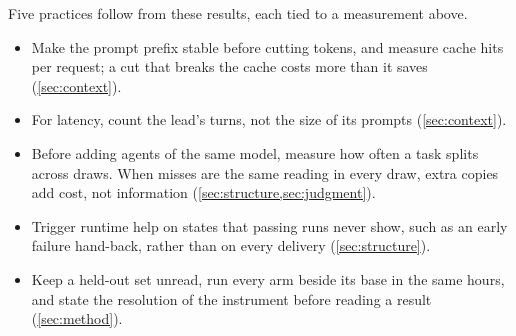  Five practices follow from these results, each tied to a
measurement above.
\begin{itemize}[leftmargin=1.4em]
  \item Make the prompt prefix stable before cutting tokens, and measure cache hits per request; a
    cut that breaks the cache costs more than it saves (\cref{sec:context}).
  \item For latency, count the lead's turns, not the size of its prompts (\cref{sec:context}).
  \item Before adding agents of the same model, measure how often a task splits across draws. When
    misses are the same reading in every draw, extra copies add cost, not information
    (\cref{sec:structure,sec:judgment}).
  \item Trigger runtime help on states that passing runs never show, such as an early failure
    hand-back, rather than on every delivery (\cref{sec:structure}).
  \item Keep a held-out set unread, run every arm beside its base in the same hours, and state the
    resolution of the instrument before reading a result (\cref{sec:method}).
\end{itemize}

